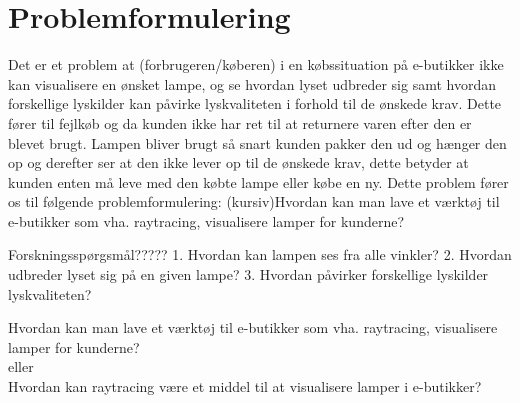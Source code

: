 \section{Problemformulering}
Det er et problem at (forbrugeren/køberen) i en købssituation på e-butikker ikke kan visualisere en ønsket lampe, og se hvordan lyset udbreder sig samt hvordan forskellige lyskilder kan påvirke lyskvaliteten i forhold til de ønskede krav. Dette fører til fejlkøb og da kunden ikke har ret til at returnere varen efter den er blevet brugt. Lampen bliver brugt så snart kunden pakker den ud og hænger den op og derefter ser at den ikke lever op til de ønskede krav, dette betyder at kunden enten må leve med den købte lampe eller købe en ny. 
Dette problem fører os til følgende problemformulering: (kursiv)Hvordan kan man lave et værktøj til e-butikker som vha. raytracing, visualisere lamper for kunderne?

Forskningsspørgsmål?????
1. Hvordan kan lampen ses fra alle vinkler?
2. Hvordan udbreder lyset sig på en given lampe?
3. Hvordan påvirker forskellige lyskilder lyskvaliteten?






Hvordan kan man lave et værktøj til e-butikker som vha. raytracing, visualisere lamper for kunderne?
\\eller\\
Hvordan kan raytracing være et middel til at visualisere lamper i e-butikker?